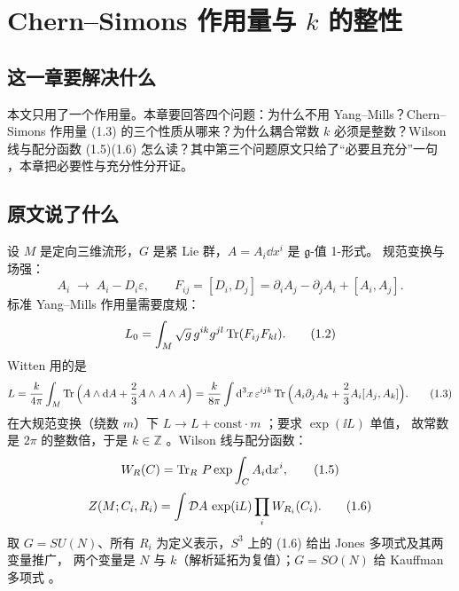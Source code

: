 \section{Chern--Simons 作用量与 $k$ 的整性}\label{sec:cs}

\subsection{这一章要解决什么}
本文只用了一个作用量。本章要回答四个问题：为什么不用 Yang--Mills？Chern--Simons 作用量
(1.3) 的三个性质从哪来？为什么耦合常数 $k$ 必须是整数？Wilson 线与配分函数 (1.5)(1.6)
怎么读？其中第三个问题原文只给了“必要且充分”一句 ，本章把必要性与充分性分开证。

\subsection{原文说了什么}
设 $M$ 是定向三维流形，$G$ 是紧 Lie 群，$A=A_i\dd x^i$ 是 $\mathfrak g$-值 1-形式。
规范变换与场强：
\begin{equation}
A_i\;\longrightarrow\;A_i-D_i\varepsilon,\qquad
F_{ij}=[D_i,D_j]=\partial_iA_j-\partial_jA_i+[A_i,A_j]. \tag{1.1}
\end{equation}
标准 Yang--Mills 作用量需要度规：
\begin{equation}
L_0=\int_M\sqrt g\,g^{ik}g^{jl}\operatorname{Tr}(F_{ij}F_{kl}). \tag{1.2}
\end{equation}
Witten 用的是
\begin{equation}
\label{eq:cs}
L=\frac{k}{4\pi}\int_M\operatorname{Tr}\Big(A\wedge \mathrm{d} A+\frac23A\wedge A\wedge A\Big)
 =\frac{k}{8\pi}\int\mathrm{d}^3x\,\varepsilon^{ijk}\operatorname{Tr}\Big(A_i\partial_jA_k+\frac23A_i[A_j,A_k]\Big).
 \tag{1.3}
\end{equation}
在大规范变换（绕数 $m$）下 $L\to L+\text{const}\cdot m$ ；要求 $\exp(\ii L)$ 单值，
故常数是 $2\pi$ 的整数倍，于是 $k\in\mathbb Z$ 。Wilson 线与配分函数：
\begin{equation}
W_R(C)=\operatorname{Tr}_R\,P\exp\int_CA_i\mathrm{d} x^i, \tag{1.5}
\end{equation}
\begin{equation}
Z(M;C_i,R_i)=\int\mathcal{D} A\,\exp(\mathrm{i} L)\prod_iW_{R_i}(C_i). \tag{1.6}
\end{equation}
取 $G=SU(N)$、所有 $R_i$ 为定义表示，$S^3$ 上的 (1.6) 给出 Jones 多项式及其两变量推广，
两个变量是 $N$ 与 $k$（解析延拓为复值）；$G=SO(N)$ 给 Kauffman 多项式 。

